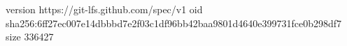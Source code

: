 version https://git-lfs.github.com/spec/v1
oid sha256:6ff27ec007e14dbbbd7e2f03c1df96bb42baa9801d4640e399731fce0b298df7
size 336427
